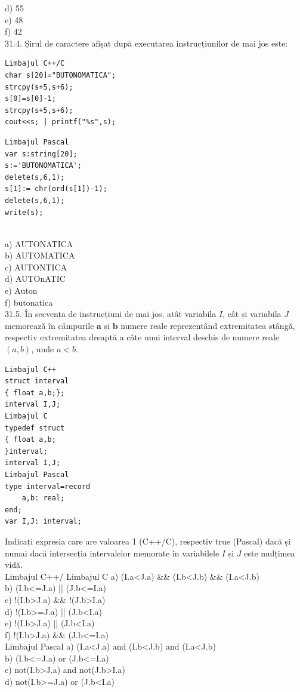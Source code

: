 \begin{itemize}
\begin{enumerate}
d) 55
\\
e) 48
\\
f) 42
\\
31.4. Șirul de caractere afișat după executarea instrucțiunilor de mai jos este:
\begin{verbatim}
Limbajul C++/C
char s[20]="BUTONOMATICA";
strcpy(s+5,s+6);
s[0]=s[0]-1;
strcpy(s+5,s+6);
cout<<s; | printf("%s",s);
\end{verbatim}
\begin{verbatim}
Limbajul Pascal
var s:string[20];
s:='BUTONOMATICA';
delete(s,6,1);
s[1]:= chr(ord(s[1])-1);
delete(s,6,1);
write(s);
\end{verbatim}
\\
a) AUTONATICA
\\
b) AUTOMATICA
\\
c) AUTONTICA
\\
d) AUTOnATIC
\\
e) Auton
\\
f) butonatica
\\
31.5. În secvența de instrucțiuni de mai jos, atât variabila $I$, cât și variabila $J$ memorează în câmpurile $\mathbf{a}$ și $\mathbf{b}$ numere reale reprezentând extremitatea stângă, respectiv extremitatea dreaptă a câte unui interval deschis de numere reale $(a,b)$, unde $a<b$.
\begin{verbatim}
Limbajul C++
struct interval
{ float a,b;};
interval I,J;
Limbajul C
typedef struct
{ float a,b;
}interval;
interval I,J;
Limbajul Pascal
type interval=record
    a,b: real;
end;
var I,J: interval;
\end{verbatim}
Indicați expresia care are valoarea 1 (C++/C), respectiv true (Pascal) dacă și numai dacă intersecția intervalelor memorate în variabilele $I$ și $J$ este mulțimea vidă.
\\
Limbajul C++/ Limbajul C
a) (I.a<J.a) \&\& (I.b<J.b) \&\& (I.a<J.b)
\\
b) (I.b<=J.a) || (J.b<=I.a)
\\
c) !(I.b>J.a) \&\& !(J.b>I.a)
\\
d) !(I.b>=J.a) || (J.b<I.a)
\\
e) !(I.b>J.a) || (J.b<I.a)
\\
f) !(I.b>J.a) \&\& (J.b<=I.a)
\\
Limbajul Pascal
a) (I.a<J.a) and (I.b<J.b) and (I.a<J.b)
\\
b) (I.b<=J.a) or (J.b<=I.a)
\\
c) not(I.b>J.a) and not(J.b>I.a)
\\
d) not(I.b>=J.a) or (J.b<I.a)

\end{enumerate}
\end{itemize}
